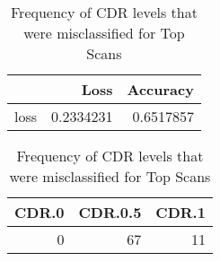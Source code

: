 \begin{table}[h] \centering
\begin{minipage}{0.3\textwidth}

\begin{tabular}{lrr}
\toprule
  & Loss & Accuracy\\
\midrule
loss & 0.2334231 & 0.6517857\\
\bottomrule
\end{tabular}
\caption{Error and Accuracy for Convolution on Top Scans}
\end{minipage}
\hspace{3cm}
\begin{minipage}{0.3\textwidth}

\begin{tabular}{rrr}
\toprule
CDR.0 & CDR.0.5 & CDR.1\\
\midrule
0 & 67 & 11\\
\bottomrule
\end{tabular}
\caption{Frequency of CDR levels that were misclassified for Top Scans}
\end{minipage}
\end{table}
